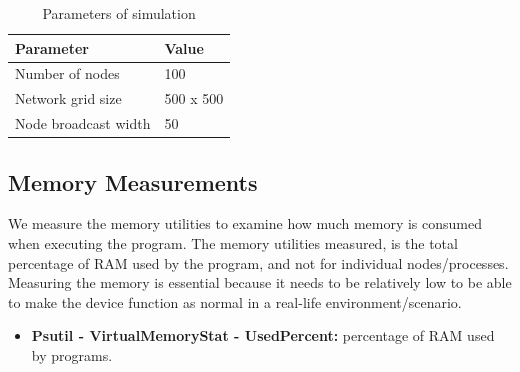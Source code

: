 \documentclass[USenglish]{uit-thesis}
\begin{document}

\begin{table}
\centering
\begin{tabular}{|l|l|}
\hline
\textbf{Parameter}       & \textbf{Value} \\ \hline
Number of nodes          & 100            \\ \hline
Network grid size        & 500 x 500      \\ \hline
Node broadcast width     & 50             \\ \hline
\end{tabular}
\caption{Parameters of simulation}
\label{tab:simTable}
\end{table}



\subsection{Memory Measurements} \label{eva:mem_measure}
We measure the memory utilities to examine how much memory is consumed when executing the program. The memory utilities measured, is the total percentage of RAM used by the program, and not for individual nodes/processes.
Measuring the memory is essential because it needs to be relatively low to be able to make the device function as normal in a real-life environment/scenario.

\begin{itemize}
\item \textbf{Psutil - VirtualMemoryStat - UsedPercent:} percentage of RAM used by programs.
\end{itemize}
\end{document}
